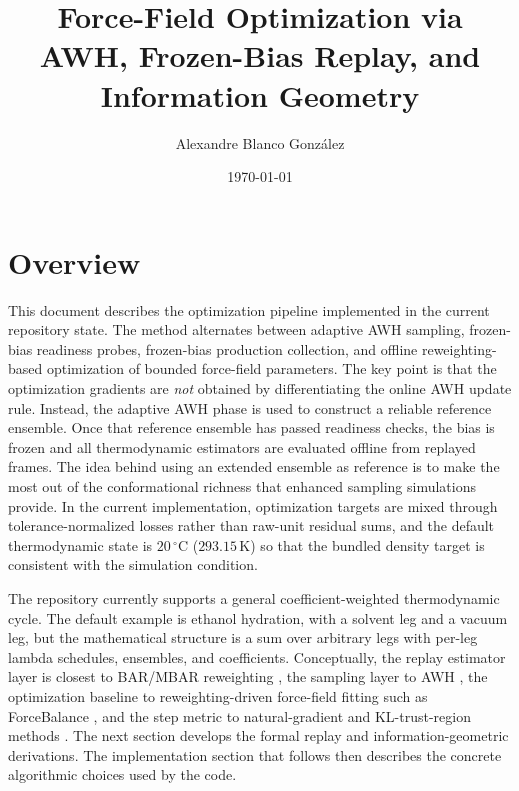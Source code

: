 \documentclass[12pt]{article}
\title{Force-Field Optimization via AWH, Frozen-Bias Replay, and Information Geometry}
\author{Alexandre Blanco González}
\date{\today}
\begin{document}
\maketitle
\tableofcontents

\section{Overview}

This document describes the optimization pipeline implemented in the current repository state. The method alternates between adaptive AWH sampling, frozen-bias readiness probes, frozen-bias production collection, and offline reweighting-based optimization of bounded force-field parameters. The key point is that the optimization gradients are \emph{not} obtained by differentiating the online AWH update rule. Instead, the adaptive AWH phase is used to construct a reliable reference ensemble. Once that reference ensemble has passed readiness checks, the bias is frozen and all thermodynamic estimators are evaluated offline from replayed frames. The idea behind using an extended ensemble as reference is to make the most out of the conformational richness that enhanced sampling simulations provide. In the current implementation, optimization targets are mixed through tolerance-normalized losses rather than raw-unit residual sums, and the default thermodynamic state is $20\,^\circ\mathrm{C}$ ($293.15\,\mathrm{K}$) so that the bundled density target is consistent with the simulation condition.

The repository currently supports a general coefficient-weighted thermodynamic cycle. The default example is ethanol hydration, with a solvent leg and a vacuum leg, but the mathematical structure is a sum over arbitrary legs with per-leg lambda schedules, ensembles, and coefficients. Conceptually, the replay estimator layer is closest to BAR/MBAR reweighting \citep{bennett1976bar,shirts2008mbar}, the sampling layer to AWH \citep{lidmar2012awh,lindahl2014awh}, the optimization baseline to reweighting-driven force-field fitting such as ForceBalance \citep{wang2014forcebalance}, and the step metric to natural-gradient and KL-trust-region methods \citep{amari1998natural,schulman2015trpo}. The next section develops the formal replay and information-geometric derivations. The implementation section that follows then describes the concrete algorithmic choices used by the code.






\end{document}
